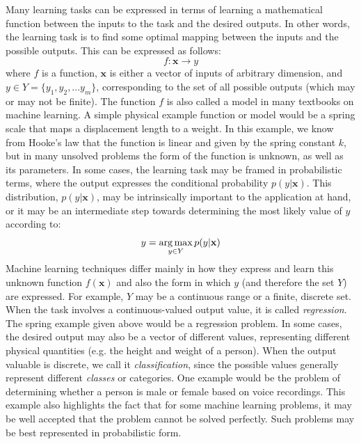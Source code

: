 Many learning tasks can be expressed in terms of learning a mathematical function between the inputs to the task and the desired outputs. In other words, the learning task is to find some optimal mapping between the inputs and the possible outputs. This can be expressed as follows:
%
\begin{equation}
f : \mathbf{x} \rightarrow y
\end{equation}where $f$ is a function, $\mathbf{x}$ is either a vector of inputs of arbitrary dimension, and $y \in Y=\{y_1, y_2,...y_m\}$, corresponding to the set of all possible outputs (which may or may not be finite). The function $f$ is also called a model in many textbooks on machine learning. A simple physical example function or model would be a spring scale that maps a displacement length to a weight. In this example, we know from Hooke's law that the function is linear and given by the spring constant $k$, but in many unsolved problems the form of the function is unknown, as well as its parameters. In some cases, the learning task may be framed in probabilistic terms, where the output expresses the conditional probability $p(y|\mathbf{x})$. This distribution, $p(y|\mathbf{x})$, may be intrinsically important to the application at hand, or it may be an intermediate step towards determining the most likely value of $y$ according to:
%
\begin{equation}
y = \operatorname*{arg\,max}_{y \in Y} p (y|\mathbf{x})
\end{equation}
%
Machine learning techniques differ mainly in how they express and learn this unknown function $f(\mathbf{x})$ and also the form in which $y$ (and therefore the set $Y$) are expressed. For example, $Y$ may be a continuous range or a finite, discrete set. When the task involves a continuous-valued output value, it is called \emph{regression}. The spring example given above would be a regression problem. In some cases, the desired output may also be a vector of different values, representing different physical quantities (e.g. the height and weight of a person). When the output valuable is discrete, we call it \emph{classification}, since the possible values generally represent different \emph{classes} or categories. One example would be the problem of determining whether a person is male or female based on voice recordings. This example also highlights the fact that for some machine learning problems, it may be well accepted that the problem cannot be solved perfectly. Such problems may be best represented in probabilistic form.

